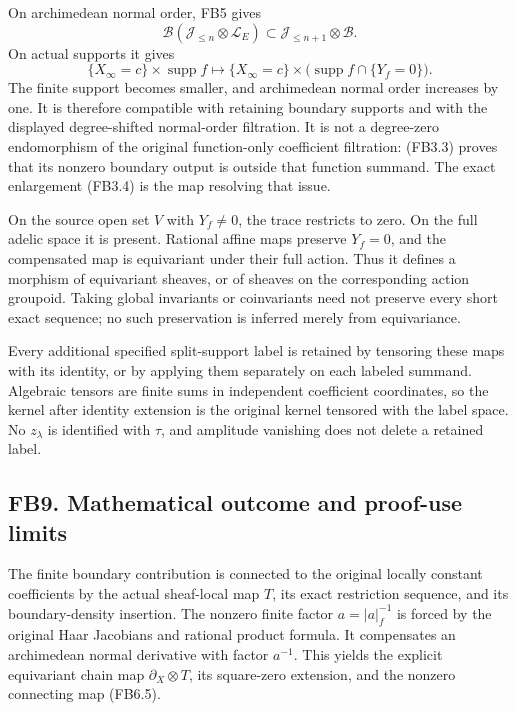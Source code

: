 On archimedean normal order, FB5 gives \[
\mathcal B(\mathcal J_{\le n}\otimes\mathscr L_E)
\subset\mathcal J_{\le n+1}\otimes\mathscr B.
\tag{FB8.1}
\] On actual supports it gives \[
\{X_\infty=c\}\times\operatorname{supp}f
\longmapsto
\{X_\infty=c\}\times
\bigl(\operatorname{supp}f\cap\{Y_f=0\}\bigr).
\tag{FB8.2}
\] The finite support becomes smaller, and archimedean normal order
increases by one. It is therefore compatible with retaining boundary
supports and with the displayed degree-shifted normal-order filtration.
It is not a degree-zero endomorphism of the original function-only
coefficient filtration: (FB3.3) proves that its nonzero boundary output
is outside that function summand. The exact enlargement (FB3.4) is the
map resolving that issue.

On the source open set \(V\) with \(Y_f\ne0\), the trace restricts to
zero. On the full adelic space it is present. Rational affine maps
preserve \(Y_f=0\), and the compensated map is equivariant under their
full action. Thus it defines a morphism of equivariant sheaves, or of
sheaves on the corresponding action groupoid. Taking global invariants
or coinvariants need not preserve every short exact sequence; no such
preservation is inferred merely from equivariance.

Every additional specified split-support label is retained by tensoring
these maps with its identity, or by applying them separately on each
labeled summand. Algebraic tensors are finite sums in independent
coefficient coordinates, so the kernel after identity extension is the
original kernel tensored with the label space. No \(z_\lambda\) is
identified with \(\tau\), and amplitude vanishing does not delete a
retained label.

\subsection{FB9. Mathematical outcome and proof-use
limits}\label{fb9.-mathematical-outcome-and-proof-use-limits}

The finite boundary contribution is connected to the original locally
constant coefficients by the actual sheaf-local map \(T\), its exact
restriction sequence, and its boundary-density insertion. The nonzero
finite factor \(a=|a|_f^{-1}\) is forced by the original Haar Jacobians
and rational product formula. It compensates an archimedean normal
derivative with factor \(a^{-1}\). This yields the explicit equivariant
chain map \(\partial_X\otimes T\), its square-zero extension, and the
nonzero connecting map (FB6.5).

